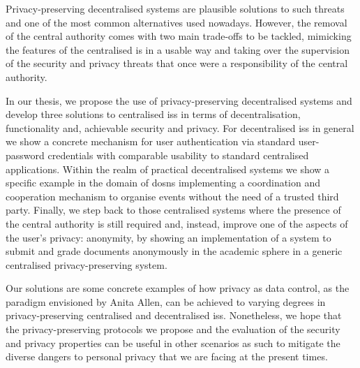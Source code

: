     Privacy-preserving decentralised systems are plausible solutions to such threats 
    and one of the most common alternatives used nowadays. However, the removal 
    of the central authority comes with two main trade-offs to be tackled, mimicking 
    the features of the centralised \acl*{is} in a usable way and taking over the 
    supervision of the security and privacy threats that once were a responsibility 
    of the central authority.
    
    In our thesis, we propose the use of privacy-preserving decentralised systems 
    and develop three solutions to centralised \aclp*{is} in terms of decentralisation, 
    functionality and, achievable security and privacy. For decentralised \aclp*{is} 
    in general we show a concrete mechanism for user authentication via standard 
    user-password credentials with comparable usability to standard centralised 
    applications. Within the realm of practical decentralised systems we show a 
    specific example in the domain of \aclp*{dosn} implementing a coordination and 
    cooperation mechanism to organise events without the need of a trusted third 
    party. Finally, we step back to those centralised systems where the presence 
    of the central authority is still required and, instead, improve one of the 
    aspects of the user's privacy: anonymity, by showing an implementation of a 
    system to submit and grade documents anonymously in the academic sphere in a 
    generic centralised privacy-preserving system.

    Our solutions are some concrete examples of how privacy as data control, as 
    the paradigm envisioned by Anita Allen, can be achieved to varying degrees in 
    privacy-preserving centralised and decentralised \aclp*{is}. Nonetheless, we 
    hope that the privacy-preserving protocols we propose and the evaluation of 
    the security and privacy properties can be useful in other scenarios as such 
    to mitigate the diverse dangers to personal privacy that we are facing at the 
    present times.
